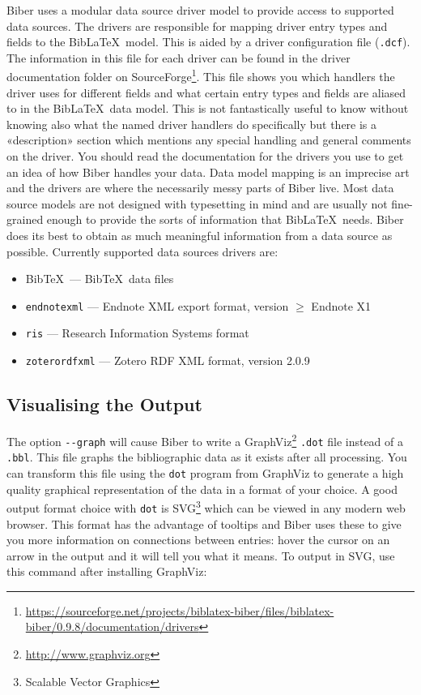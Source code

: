 \documentclass{ltxdockit}
\gdef\biberversion{0.9.8}    %
\begin{document}
Biber uses a modular data source driver model to provide access
to supported data sources. The drivers are responsible for mapping
driver entry types and fields to the Bib\LaTeX\ model. This is
aided by a driver configuration file (\verb+.dcf+). The information in
this file for each driver can be found in the driver documentation folder on
SourceForge\footnote{\url{https://sourceforge.net/projects/biblatex-biber/files/biblatex-biber/\biberversion/documentation/drivers}}. This
file shows you which handlers the driver uses for different fields and
what certain entry types and fields are aliased to in the
Bib\LaTeX\ data model. This is not fantastically useful to know
without knowing also what the named driver handlers do specifically but there
is a «description» section which mentions any special handling and
general comments on the driver. You should read the documentation for
the drivers you use to get an idea of how Biber handles your
data. Data model mapping is an imprecise art
and the drivers are where the necessarily messy parts of Biber
live. Most data source models are not designed with typesetting in
mind and are usually not fine-grained enough to provide the sorts of
information that Bib\LaTeX\ needs. Biber does its best to
obtain as much meaningful information from a data source as possible.
Currently supported data sources drivers are:

\begin{itemize}
\item Bib\TeX\ --- Bib\TeX\ data files
\item \verb+endnotexml+ --- Endnote XML export format, version $\geq$ Endnote X1
\item \verb+ris+ --- Research Information Systems format
\item \verb+zoterordfxml+ --- Zotero RDF XML format, version 2.0.9
\end{itemize}

\subsection{Visualising the Output}\label{vis}

The option \verb+--graph+ will cause Biber to write a
GraphViz\footnote{\url{http://www.graphviz.org}} \verb+.dot+ file instead
of a \verb+.bbl+. This file graphs the bibliographic data as it exists
after all processing. You can transform this file using the \verb+dot+
program from GraphViz to generate a high quality graphical representation
of the data in a format of your choice. A good output format choice with
\verb+dot+ is SVG\footnote{Scalable Vector Graphics} which can be viewed in
any modern web browser. This format has the advantage of tooltips and Biber
uses these to give you more information on connections between entries:
hover the cursor on an arrow in the output and it will tell you what it
means. To output in SVG, use this command after installing GraphViz:
\end{document}
